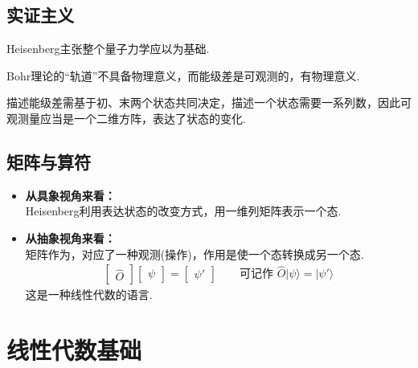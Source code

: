 \subsection{实证主义}
Heisenberg主张整个量子力学应以为基础.

Bohr理论的“轨道”不具备物理意义，而能级差是可观测的，有物理意义.

描述能级差需基于初、末两个状态共同决定，描述一个状态需要一系列数，因此可观测量应当是一个二维方阵，表达了状态的变化.

\subsection{矩阵与算符}
\begin{itemize}
    \item \textbf{从具象视角来看：} \\
    Heisenberg利用表达状态的改变方式，用一维列矩阵表示一个态.
    \item \textbf{从抽象视角来看：} \\
    矩阵作为，对应了一种观测(操作)，作用是使一个态转换成另一个态.
    \begin{gather*}
        \begin{bmatrix} \hat{O} \end{bmatrix} 
        \begin{bmatrix} \psi \end{bmatrix} = 
        \begin{bmatrix} \psi' \end{bmatrix} \qquad
        \text{可记作 } \hat{O} |\psi\rangle = |\psi'\rangle
    \end{gather*}
    这是一种线性代数的语言.
\end{itemize}

\section{线性代数基础}
